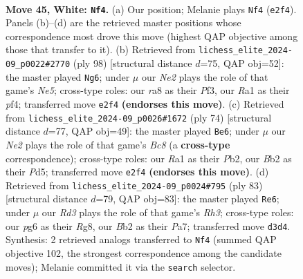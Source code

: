 \documentclass[11pt]{article}
\begin{document}
\clearpage

\begin{figure}[p]\centering
\begin{subfigure}{0.46\textwidth}\centering
\resizebox{\linewidth}{!}{%
\newchessgame
\chessboard[
  setfen={r2b4/1p5p/nk4pP/p3rp2/P2p4/3R2P1/1B2N3/R6K w - - 0 45},
  showmover=false,
  pgfstyle=straightmove, color=movearrow, markmove={e2-f4}
]}
\caption{}
\end{subfigure}\hfill
\begin{subfigure}{0.46\textwidth}\centering
\resizebox{\linewidth}{!}{%
\newchessgame
\chessboard[
  setfen={3rk3/2Rp4/1P2p2p/n1P1Np2/5p1r/5P2/5K1P/7R w - - 4 50},
  showmover=false,
  pgfstyle=straightmove, color=movearrow, markmove={e5-g6}
]}
\caption{}
\end{subfigure}
\\[4pt]
\begin{subfigure}{0.46\textwidth}\centering
\resizebox{\linewidth}{!}{%
\newchessgame
\chessboard[
  setfen={r1B5/4r2p/2Rp1bk1/3P2p1/pR3p2/3P1P2/KP5P/8 w - - 14 38},
  showmover=false,
  pgfstyle=straightmove, color=movearrow, markmove={c8-e6}
]}
\caption{}
\end{subfigure}\hfill
\begin{subfigure}{0.46\textwidth}\centering
\resizebox{\linewidth}{!}{%
\newchessgame
\chessboard[
  setfen={6rk/pp5p/7r/3R2n1/6P1/2P1p2P/PP2R1P1/7K b - - 0 42},
  showmover=false,
  pgfstyle=straightmove, color=movearrow, markmove={h6-e6}
]}
\caption{}
\end{subfigure}
\caption{\textbf{Move 45, White: \texttt{Nf4}.} (a) Our position; Melanie plays \texttt{Nf4} (\texttt{e2f4}). Panels (b)--(d) are the retrieved master positions whose correspondence most drove this move (highest QAP objective among those that transfer to it). (b) Retrieved from \texttt{lichess\_elite\_2024-09\_p0022\#2770} (ply 98) [structural distance $d$=75, QAP obj=52]: the master played \texttt{Ng6}; under $\mu$ our \emph{Ne2} plays the role of that game's \emph{Ne5}; cross-type roles: our \emph{r}a8 as their \emph{P}f3, our \emph{R}a1 as their \emph{p}f4; transferred move \texttt{e2f4} \textbf{(endorses this move)}. (c) Retrieved from \texttt{lichess\_elite\_2024-09\_p0026\#1672} (ply 74) [structural distance $d$=77, QAP obj=49]: the master played \texttt{Be6}; under $\mu$ our \emph{Ne2} plays the role of that game's \emph{Bc8} (a \textbf{cross-type} correspondence); cross-type roles: our \emph{R}a1 as their \emph{P}b2, our \emph{B}b2 as their \emph{P}d5; transferred move \texttt{e2f4} \textbf{(endorses this move)}. (d) Retrieved from \texttt{lichess\_elite\_2024-09\_p0024\#795} (ply 83) [structural distance $d$=79, QAP obj=83]: the master played \texttt{Re6}; under $\mu$ our \emph{Rd3} plays the role of that game's \emph{Rh3}; cross-type roles: our \emph{p}g6 as their \emph{R}g8, our \emph{B}b2 as their \emph{P}a7; transferred move \texttt{d3d4}. Synthesis: 2 retrieved analogs transferred to \texttt{Nf4} (summed QAP objective 102, the strongest correspondence among the candidate moves); Melanie committed it via the \texttt{search} selector.}
\label{fig:thought-m88}
\end{figure}
\end{document}
